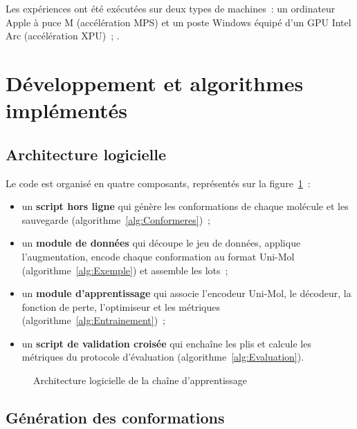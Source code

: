 Les expériences ont été exécutées sur deux types de machines~: un ordinateur Apple à puce M (accélération MPS) et un poste Windows équipé d'un GPU Intel Arc (accélération XPU)~; .


\section{Développement et algorithmes implémentés}
\label{sec:Developpement}

\subsection{Architecture logicielle}

Le code est organisé en quatre composants, représentés sur la figure~\ref{fig:Architecture}~:
\begin{itemize}
   \item un \textbf{script hors ligne} qui génère les conformations de chaque molécule et les sauvegarde (algorithme~\ref{alg:Conformeres})~;
   \item un \textbf{module de données} qui découpe le jeu de données, applique l'augmentation, encode chaque conformation au format Uni-Mol (algorithme~\ref{alg:Exemple}) et assemble les lots~;
   \item un \textbf{module d'apprentissage} qui associe l'encodeur Uni-Mol, le décodeur, la fonction de perte, l'optimiseur et les métriques (algorithme~\ref{alg:Entrainement})~;
   \item un \textbf{script de validation croisée} qui enchaîne les plis et calcule les métriques du protocole d'évaluation (algorithme~\ref{alg:Evaluation}).
\end{itemize}

\begin{figure}
   \centering
   \caption{Architecture logicielle de la chaîne d'apprentissage}
   \label{fig:Architecture}
\end{figure}

\subsection{Génération des conformations}

